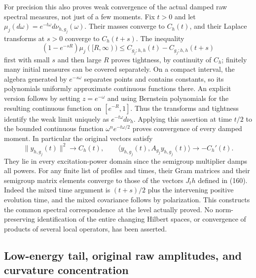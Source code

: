 \documentclass[11pt]{article}
\begin{document}
For precision this also proves weak convergence of the actual
damped raw spectral measures, not just of a few moments. Fix $t>0$
and let $\mu_j(d\omega)=e^{-t\omega}d\nu_{h,g_j}(\omega)$.
Their masses converge to $C_h(t)$, and their Laplace transforms
at $s>0$ converge to $C_h(t+s)$. The inequality
\[
 (1-e^{-sR})\mu_j([R,\infty))
       \le C_{g_j;h,h}(t)-C_{g_j;h,h}(t+s)
\]
first with small $s$ and then large $R$ proves tightness, by
continuity of $C_h$; finitely many initial measures can be covered
separately. On a compact interval, the algebra generated by
$e^{-s\omega}$ separates points and contains constants, so its
polynomials uniformly approximate continuous functions there.
An explicit version follows by setting $z=e^{-\omega}$ and using
Bernstein polynomials for the resulting continuous function on
$[e^{-R},1]$. Thus the transforms and tightness identify the weak
limit uniquely as $e^{-t\omega}d\nu_h$. Applying this assertion
at time $t/2$ to the bounded continuous function
$\omega^n e^{-t\omega/2}$ proves convergence of every damped
moment. In particular the original vectors satisfy
\begin{equation}\label{eq:full-actual-norm-energy}
 \|y_{h,g_j}(t)\|^2\longrightarrow C_h(t),\qquad
 \langle y_{h,g_j}(t),A_{g_j}y_{h,g_j}(t)\rangle
       \longrightarrow -C_h'(t).
\end{equation}
They lie in every excitation-power domain since the semigroup
multiplier damps all powers. For any finite list of profiles and
times, their Gram matrices and their semigroup matrix elements
converge to those of the vectors $J_t h$ defined in
(160). Indeed the mixed time argument is
$(t+s)/2$ plus the intervening positive evolution time, and the
mixed covariance follows by polarization. This constructs the
common spectral correspondence at the level actually proved.
No norm-preserving identification of the entire changing Hilbert
spaces, or convergence of products of several local operators,
has been asserted.

\subsection{Low-energy tail, original raw amplitudes, and curvature concentration}
\end{document}

